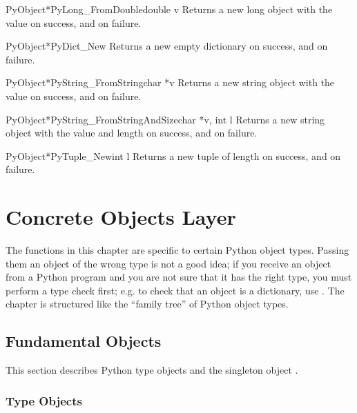 \documentclass[twoside,openright]{report}
\begin{document}
\begin{cfuncdesc}{PyObject*}{PyLong_FromDouble}{double v}
Returns a new long object with the value  on success, and
\NULL{} on failure.
\end{cfuncdesc}

\begin{cfuncdesc}{PyObject*}{PyDict_New}{}
Returns a new empty dictionary on success, and \NULL{} on
failure.
\end{cfuncdesc}

\begin{cfuncdesc}{PyObject*}{PyString_FromString}{char *v}
Returns a new string object with the value  on success, and
\NULL{} on failure.
\end{cfuncdesc}

\begin{cfuncdesc}{PyObject*}{PyString_FromStringAndSize}{char *v, int l}
Returns a new string object with the value  and length 
on success, and \NULL{} on failure.
\end{cfuncdesc}

\begin{cfuncdesc}{PyObject*}{PyTuple_New}{int l}
Returns a new tuple of length  on success, and \NULL{} on
failure.
\end{cfuncdesc}


\chapter{Concrete Objects Layer}

The functions in this chapter are specific to certain Python object
types.  Passing them an object of the wrong type is not a good idea;
if you receive an object from a Python program and you are not sure
that it has the right type, you must perform a type check first;
e.g. to check that an object is a dictionary, use
.  The chapter is structured like the
``family tree'' of Python object types.


\section{Fundamental Objects}

This section describes Python type objects and the singleton object 
.


\subsection{Type Objects}
\end{document}
